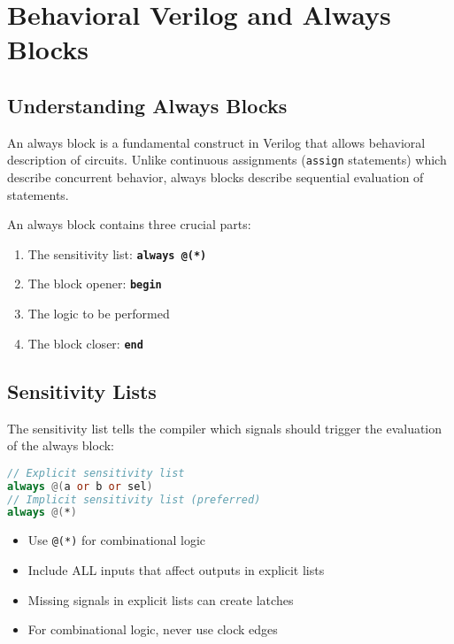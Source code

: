 \documentclass[12pt]{betterjournal}
\begin{document}
\section{Behavioral Verilog and Always Blocks}

\subsection{Understanding Always Blocks}

An always block is a fundamental construct in Verilog that allows behavioral description of circuits. Unlike continuous assignments (\texttt{assign} statements) which describe concurrent behavior, always blocks describe sequential evaluation of statements.

\begin{important}[frametitle={Always Block Structure}]
An always block contains three crucial parts:
\begin{enumerate}
    \item The sensitivity list: \textbf{\texttt{always @(*)}}
    \item The block opener: \textbf{\texttt{begin}}
    \item The logic to be performed 
    \item The block closer: \textbf{\texttt{end}}
\end{enumerate}
\end{important}

\subsection{Sensitivity Lists}

The sensitivity list tells the compiler which signals should trigger the evaluation of the always block:

\begin{lstlisting}[language=verilog]
// Explicit sensitivity list
always @(a or b or sel) 
// Implicit sensitivity list (preferred)
always @(*)
\end{lstlisting}

\begin{extra}[frametitle={Sensitivity List Best Practices}]
\begin{itemize}
    \item Use \texttt{@(*)} for combinational logic
    \item Include ALL inputs that affect outputs in explicit lists
    \item Missing signals in explicit lists can create latches
    \item For combinational logic, never use clock edges
\end{itemize}
\end{extra}
\end{document}
